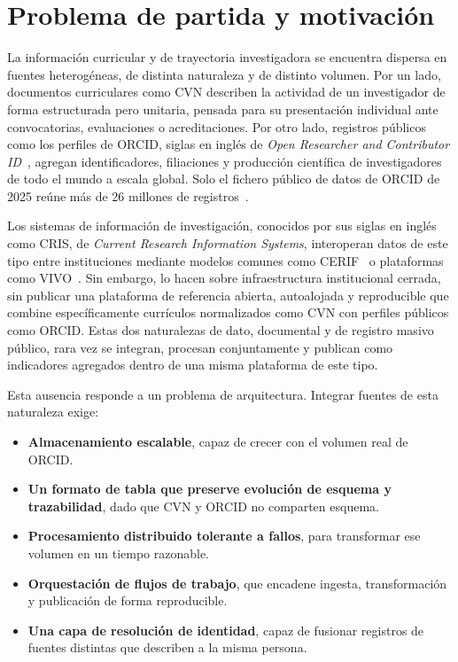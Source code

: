 \section{Problema de partida y motivación}
\label{sec:introduccion_motivacion}

La información curricular y de trayectoria investigadora se encuentra
dispersa en fuentes heterogéneas, de distinta naturaleza y de distinto
volumen. Por un lado, documentos curriculares como CVN describen la
actividad de un investigador de forma estructurada pero unitaria, pensada
para su presentación individual ante convocatorias, evaluaciones o
acreditaciones. Por otro lado, registros públicos como los perfiles de
ORCID, siglas en inglés de \textit{Open Researcher and Contributor
ID}~\cite{orcid_about}, agregan identificadores, filiaciones y producción
científica de investigadores de todo el mundo a escala global. Solo el
fichero público de datos de ORCID de 2025 reúne más de 26 millones de
registros~\cite{orcid_public_data_file_2025}.

Los sistemas de información de investigación, conocidos por sus siglas en
inglés como CRIS, de \textit{Current Research Information Systems},
interoperan datos de este tipo entre instituciones mediante modelos
comunes como CERIF~\cite{eurocris_cerif} o plataformas como
VIVO~\cite{vivo_project}. Sin embargo, lo hacen sobre infraestructura
institucional cerrada, sin publicar una plataforma de referencia abierta,
autoalojada y reproducible que combine específicamente currículos
normalizados como CVN con perfiles públicos como ORCID. Estas dos
naturalezas de dato, documental y de registro masivo público, rara vez se
integran, procesan conjuntamente y publican como indicadores agregados
dentro de una misma plataforma de este tipo.

Esta ausencia responde a un problema de arquitectura. Integrar fuentes de
esta naturaleza exige:

\begin{itemize}
  \item \textbf{Almacenamiento escalable}, capaz de crecer con el volumen
  real de ORCID.
  \item \textbf{Un formato de tabla que preserve evolución de esquema y
  trazabilidad}, dado que CVN y ORCID no comparten esquema.
  \item \textbf{Procesamiento distribuido tolerante a fallos}, para
  transformar ese volumen en un tiempo razonable.
  \item \textbf{Orquestación de flujos de trabajo}, que encadene ingesta,
  transformación y publicación de forma reproducible.
  \item \textbf{Una capa de resolución de identidad}, capaz de fusionar
  registros de fuentes distintas que describen a la misma persona.
\end{itemize}


